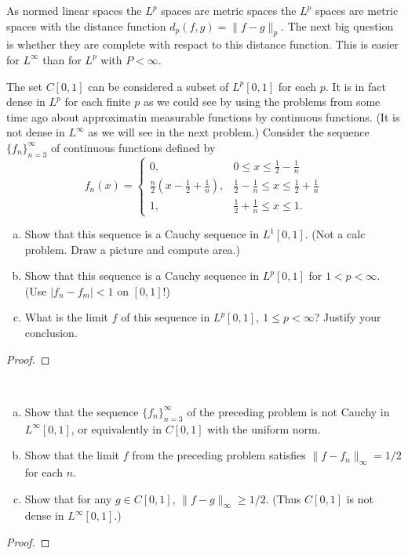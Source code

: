 \begin{rmk}%
	As normed linear spaces the $L^p$ spaces are metric spaces the $L^p$ spaces are 
	metric spaces with the distance function $d_p(f, g) = \|f - g\|_p$. The next big 
	question is whether they are complete with respact to this distance function. This 
	is easier for $L^\infty$ than for $L^p$ with $P < \infty$. 
\end{rmk}

\begin{pblm}%
	The set $C[0,1]$ can be considered a subset of $L^p[0,1]$ for each $p$. It is in 
	fact dense in $L^p$ for each finite $p$ as we could see by using the problems from 
	some time ago about approximatin measurable functions by continuous functions. (It 
	is not dense in $L^\infty$ as we will see in the next problem.) Consider the sequence 
	$\{f_n\}_{n=3}^\infty$ of continuous functions defined by 
	\begin{equation*}
		f_n(x) = \left\{
		\begin{matrix}
		0, & 0 \le x \le \frac{1}{2} - \frac{1}{n}\\
		\frac{n}{2}\left(x - \frac{1}{2} + \frac{1}{n}\right), & \frac{1}{2} - \frac{1}{n} \le x \le \frac{1}{2} + \frac{1}{n}\\
		1, & \frac{1}{2} + \frac{1}{n} \le x \le 1.
		\end{matrix}
		\right.
	\end{equation*}
	\begin{enumerate}[(a)]
		\item Show that this sequence is a Cauchy sequence in $L^1[0,1]$. (Not a 
			calc problem. Draw a picture and compute area.)
		\item Show that this sequence is a Cauchy sequence in $L^p[0,1]$ for $1 < p < \infty$. 
			(Use $|f_n - f_m| < 1$ on $[0,1]$!)
		\item What is the limit $f$ of this sequence in $L^p[0,1],~1\le p<\infty$? 
			Justify your conclusion. 
	\end{enumerate}
\begin{proof}
\end{proof}
\end{pblm}

\begin{pblm}~ %
	\begin{enumerate}[(a)]
	\item Show that the sequence $\{f_n\}_{n=3}^\infty$ of the preceding problem is not 
		Cauchy in $L^\infty[0,1]$, or equivalently in $C[0,1]$ with the uniform norm. 
	\item Show that the limit $f$ from the preceding problem satisfies $\|f - f_n\|_\infty = 1/2$ 
		for each $n$. 
	\item Show that for any $g \in C[0,1]$, $\|f - g\|_\infty \ge 1/2$. (Thus $C[0,1]$ is not 
		dense in $L^\infty[0,1]$.)
	\end{enumerate}
\begin{proof}
\end{proof}
\end{pblm}

